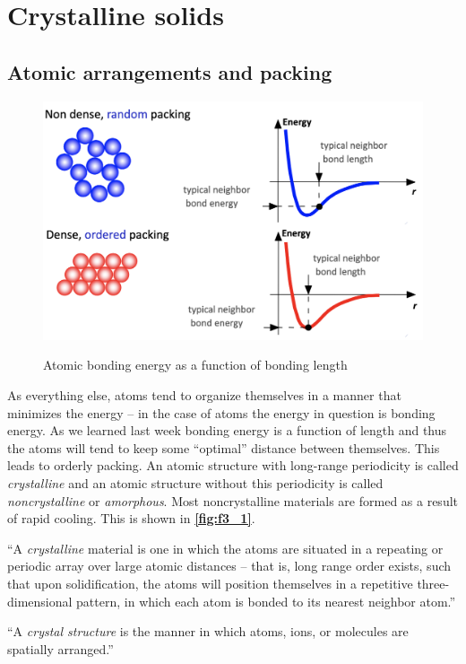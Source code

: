 
\section{Crystalline solids}

\subsection{Atomic arrangements and packing}
\begin{figure} [ht]
  \centering
  \caption{Atomic bonding energy as a function of bonding length}
  \includegraphics[width=0.5\linewidth]{./figures/f3_1.png}
  \label{fig:f3_1}
\end{figure}
As everything else, atoms tend to organize themselves in a manner that minimizes the energy -- in the case of atoms the energy in question is bonding energy. As we learned last week bonding energy is a function of length and thus the atoms will tend to keep some ``optimal'' distance between themselves. This leads to orderly packing. An atomic structure with long-range periodicity is called \textit{crystalline} and an atomic structure without this periodicity is called \textit{noncrystalline} or \textit{amorphous}. Most noncrystalline materials are formed as a result of rapid cooling. This is shown in \textbf{\autoref{fig:f3_1}}.

\begin{definition}[Crystalline]
  ``A \textit{crystalline} material is one in which the atoms are situated in a repeating or periodic array over large atomic distances -- that is, long range order exists, such that upon solidification, the atoms will position themselves in a repetitive three-dimensional pattern, in which each atom is bonded to its nearest neighbor atom.''
\end{definition}

\begin{definition}
  ``A \textit{crystal structure} is the manner in which atoms, ions, or molecules are spatially arranged.''
\end{definition}

